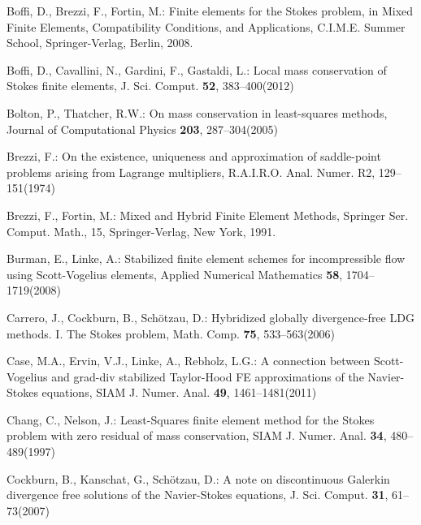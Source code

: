 \documentclass[12pt,showkeys]{amsart}
\begin{document}
\begin{thebibliography}{000}
\newblock Boffi, D., Brezzi, F., Fortin, M.: 
\rm{Finite elements for the Stokes problem}, in Mixed Finite Elements, Compatibility Conditions, and Applications, C.I.M.E. Summer School, Springer-Verlag, Berlin, 2008.

\newblock Boffi, D., Cavallini, N., Gardini, F., Gastaldi, L.: 
\rm{Local mass conservation of Stokes finite elements}, J. Sci. Comput. \textbf{52}, 383--400(2012)

\newblock Bolton, P., Thatcher, R.W.:
\rm{On mass conservation in least-squares methods}, Journal of Computational Physics \textbf{203}, 287--304(2005)

\newblock Brezzi, F.:
\rm{On the existence, uniqueness and approximation of saddle-point problems arising from Lagrange multipliers}, R.A.I.R.O. Anal. Numer. R2, 129--151(1974)

\newblock Brezzi, F., Fortin, M.: 
\rm{Mixed and Hybrid Finite Element Methods}, Springer Ser. Comput. Math., 15, Springer-Verlag, New York, 1991.

\newblock Burman, E., Linke, A.: 
\rm{Stabilized finite element schemes for incompressible flow using Scott-Vogelius elements}, Applied Numerical Mathematics \textbf{58}, 1704--1719(2008)

\newblock Carrero, J., Cockburn, B., Sch\"{o}tzau, D.: 
\rm{Hybridized globally divergence-free LDG methods. I. The Stokes problem}, Math. Comp. \textbf{75}, 533--563(2006)

\newblock Case, M.A., Ervin, V.J., Linke, A., Rebholz, L.G.: 
\rm{A connection between Scott-Vogelius and grad-div stabilized Taylor-Hood FE approximations of the Navier-Stokes equations}, SIAM J. Numer. Anal. \textbf{49}, 1461--1481(2011)

\newblock Chang, C., Nelson, J.:
\rm{Least-Squares finite element method for the Stokes problem with zero residual of mass conservation}, SIAM J. Numer. Anal. \textbf{34}, 480--489(1997)

\newblock Cockburn, B., Kanschat, G., Sch\"otzau, D.: 
\rm{A note on discontinuous Galerkin divergence free solutions of the Navier-Stokes equations}, J. Sci. Comput. \textbf{31}, 61--73(2007)


\end{thebibliography}
\end{document}
